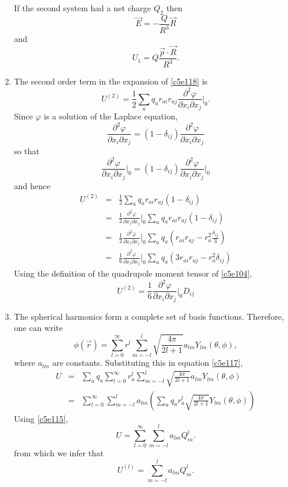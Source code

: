 \begin{enumerate}
If the second system had a net charge $Q_2$ then
\[
\vec{E} = -\frac{Q}{R^3}\vec{R}
\]
and
\begin{equation}\label{c5e126}
U_1 = Q\frac{\vec{p}\cdot\vec{R}}{R^3}.
\end{equation}

\item The second order term in the expansion of \eqref{c5e118} is
\[
U^{(2)} = \frac{1}{2}\sum_a q_a r_{ai}r_{aj}\frac{\partial^2\varphi}{\partial x_i\partial x_j}\Big|_0.
\]
Since $\varphi$ is a solution of the Laplace equation,
\[
\frac{\partial^2\varphi}{\partial x_i\partial x_j} = 
(1 - \delta_{ij})\frac{\partial^2\varphi}{\partial x_i\partial x_j}
\]
so that
\[
\frac{\partial^2\varphi}{\partial x_i\partial x_j}\Big|_0 = 
(1 - \delta_{ij})\frac{\partial^2\varphi}{\partial x_i\partial x_j}\Big|_0
\]
and hence
\begin{eqnarray*}
U^{(2)} &=& \frac{1}{2}\sum_a q_a r_{ai}r_{aj}(1 - \delta_{ij}) \\
 &=& \frac{1}{2}\frac{\partial^2\varphi}{\partial x_i\partial x_j}\Big|_0\sum_a q_a r_{ai}r_{aj}(1 - \delta_{ij}) \\
 &=& \frac{1}{2}\frac{\partial^2\varphi}{\partial x_i\partial x_j}\Big|_0\sum_a q_a (r_{ai}r_{aj} - r_a^2\frac{\delta_{ij}}{3}) \\
 &=& \frac{1}{6}\frac{\partial^2\varphi}{\partial x_i\partial x_j}\Big|_0\sum_a q_a (3r_{ai}r_{aj} - r_a^2\delta_{ij})
\end{eqnarray*}
Using the definition of the quadrupole moment tensor of \eqref{c5e104},
\begin{equation}\label{c5e127}
U^{(2)} = \frac{1}{6}\frac{\partial^2\varphi}{\partial x_i\partial x_j}\Big|_0D_{ij}
\end{equation}

\item The spherical harmonics form a complete set of basis functions. Therefore,
one can write
\begin{equation}\label{c5e128}
\phi(\vec{r}) = \sum_{l=0}^\infty r^l\sum_{m=-l}^l\sqrt{\frac{4\pi}{2l+1}}a_{lm}Y_{lm}(\theta,\phi),
\end{equation}
where $a_{lm}$ are constants. Substituting this in equation \eqref{c5e117},
\begin{eqnarray*}
U &=& \sum_a q_a\sum_{l=0}^\infty r_a^l\sum_{m=-l}^l\sqrt{\frac{4\pi}{2l+1}}a_{lm}Y_{lm}(\theta,\phi) \\
  &=& \sum_{l=0}^\infty\sum_{m=-l}^l a_{lm}\left(\sum_a q_ar_a^l\sqrt{\frac{4\pi}{2l+1}}Y_{lm}(\theta,\phi)\right)
\end{eqnarray*}
Using \eqref{c5e115},
\[
U = \sum_{l=0}^\infty\sum_{m=-l}^l a_{lm}Q_m^l.
\]
from which we infer that
\begin{equation}\label{c5e129}
U^{(l)} = \sum_{m=-l}^l a_{lm}Q_m^l.
\end{equation}


\end{enumerate}
